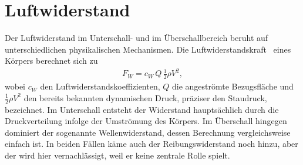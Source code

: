 %
%
%
%
\section{Luftwiderstand\label{ueberschall:section:Luftwiderstand}}
Der Luftwiderstand im Unterschall- und im Überschallbereich 
beruht auf unterschiedlichen physikalischen Mechanismen.
Die Luftwiderstandskraft~\cite{StroemwiderWikiDE} eines Körpers 
berechnet sich zu
\begin{align*}
    F_W
    = c_W \, Q \, \frac{1}{2} \rho V^2,
\end{align*}
wobei $c_W$ den Luftwiderstandskoeffizienten, $Q$ die angeströmte 
Bezugsfläche und $\tfrac{1}{2}\rho V^2$ den bereits bekannten dynamischen Druck, 
präziser den Staudruck, bezeichnet.
Im Unterschall entsteht der Widerstand hauptsächlich durch die Druckverteilung 
infolge der Umströmung des Körpers. 
Im Überschall hingegen dominiert der sogenannte Wellenwiderstand, 
dessen Berechnung vergleichsweise einfach ist.
In beiden Fällen käme auch der Reibungswiderstand noch hinzu,
aber der wird hier vernachlässigt, weil er keine zentrale Rolle spielt.

